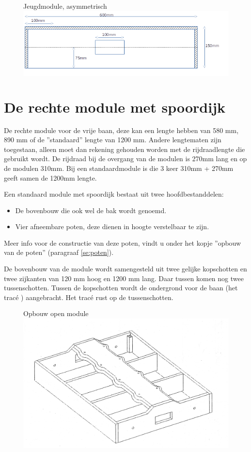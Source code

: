 \documentclass[12pt,a4paper]{report}
\newcommand*{\trace}{trac\'{e} }
\begin{document}
\begin{figure}[!ht]
  \captionbox
  {Jeugdmodule, asymmetrisch\label{im:jeugdbak}}
  {\includegraphics[scale=0.9]{images/jeugdbak}}
\end{figure}

\section{De rechte module met spoordijk}
De rechte module voor de vrije baan, deze kan een lengte hebben van 580 mm, 890 mm of de ''standaard'' lengte van 1200 mm.
Andere lengtematen zijn toegestaan, alleen moet dan rekening gehouden worden met de rijdraadlengte die gebruikt wordt. De rijdraad bij de overgang van de modulen is 270mm lang en op de modulen 310mm.
Bij een standaardmodule is die 3 keer 310mm + 270mm geeft samen de 1200mm lengte.

Een standaard module met spoordijk bestaat uit twee hoofdbestanddelen:
\begin{itemize}
\item De bovenbouw die ook wel de bak wordt genoemd.
\item Vier afneembare poten, deze dienen in hoogte verstelbaar te zijn.
\end{itemize}
Meer info voor de constructie van deze poten, vindt u onder het kopje ''opbouw van de poten'' (paragraaf \ref{se:poten}).

De bovenbouw van de module wordt samengesteld uit twee gelijke kopschotten en twee zijkanten van 120 mm hoog en 1200 mm lang. Daar tussen komen nog twee tussenschotten.
Tussen de kopschotten wordt de ondergrond voor de baan (het \trace) aangebracht. Het \trace rust op de tussenschotten. 

\begin{figure}[ht]
  \captionbox
  {Opbouw open module\label{figuur1}}
  {\includegraphics[scale=0.2]{images/rcu_figuur1}}
\end{figure}
\end{document}
